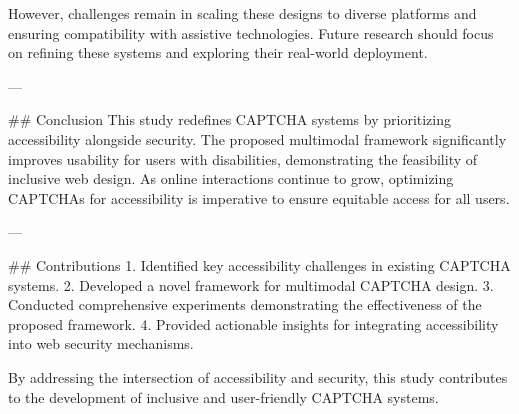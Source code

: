 However, challenges remain in scaling these designs to diverse platforms and ensuring compatibility with assistive technologies. Future research should focus on refining these systems and exploring their real-world deployment.

---

## Conclusion
This study redefines CAPTCHA systems by prioritizing accessibility alongside security. The proposed multimodal framework significantly improves usability for users with disabilities, demonstrating the feasibility of inclusive web design. As online interactions continue to grow, optimizing CAPTCHAs for accessibility is imperative to ensure equitable access for all users.

---

## Contributions
1. Identified key accessibility challenges in existing CAPTCHA systems.
2. Developed a novel framework for multimodal CAPTCHA design.
3. Conducted comprehensive experiments demonstrating the effectiveness of the proposed framework.
4. Provided actionable insights for integrating accessibility into web security mechanisms.

By addressing the intersection of accessibility and security, this study contributes to the development of inclusive and user-friendly CAPTCHA systems.